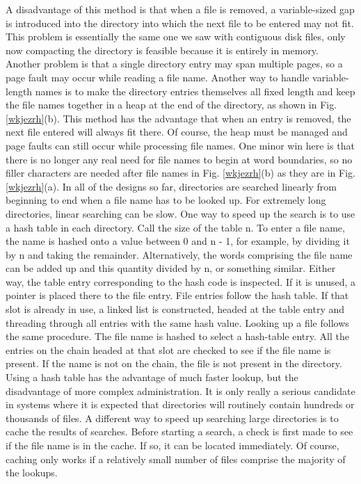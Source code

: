A disadvantage of this method is that when a file is removed, a variable-sized
gap is introduced into the directory into which the next file to be entered may not
fit. This problem is essentially the same one we saw with contiguous disk files,
only now compacting the directory is feasible because it is entirely in memory. Another
problem is that a single directory entry may span multiple pages, so a page
fault may occur while reading a file name.
Another way to handle variable-length names is to make the directory entries
themselves all fixed length and keep the file names together in a heap at the end of
the directory, as shown in Fig. \ref{wkjezrh}(b). This method has the advantage that when
an entry is removed, the next file entered will always fit there. Of course, the heap
must be managed and page faults can still occur while processing file names. One
minor win here is that there is no longer any real need for file names to begin at
word boundaries, so no filler characters are needed after file names in Fig. \ref{wkjezrh}(b)
as they are in Fig. \ref{wkjezrh}(a).
In all of the designs so far, directories are searched linearly from beginning to
end when a file name has to be looked up. For extremely long directories, linear
searching can be slow. One way to speed up the search is to use a hash table in
each directory. Call the size of the table n. To enter a file name, the name is hashed
onto a value between 0 and n - 1, for example, by dividing it by n and taking the
remainder. Alternatively, the words comprising the file name can be added up and
this quantity divided by n, or something similar.
Either way, the table entry corresponding to the hash code is inspected. If it is
unused, a pointer is placed there to the file entry. File entries follow the hash table.
If that slot is already in use, a linked list is constructed, headed at the table entry
and threading through all entries with the same hash value.
Looking up a file follows the same procedure. The file name is hashed to select
a hash-table entry. All the entries on the chain headed at that slot are checked to
see if the file name is present. If the name is not on the chain, the file is not present
in the directory.
Using a hash table has the advantage of much faster lookup, but the disadvantage
of more complex administration. It is only really a serious candidate in systems
where it is expected that directories will routinely contain hundreds or thousands
of files.
A different way to speed up searching large directories is to cache the results
of searches. Before starting a search, a check is first made to see if the file name is
in the cache. If so, it can be located immediately. Of course, caching only works
if a relatively small number of files comprise the majority of the lookups.

